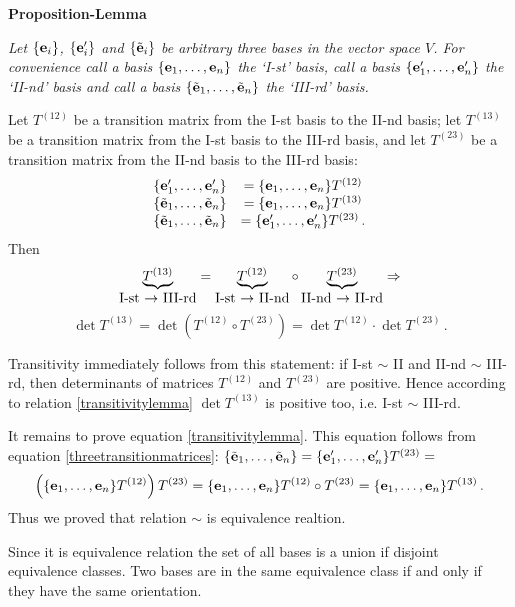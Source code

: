 \documentclass[12pt]{article}
\numberwithin{equation}{section}
\begin{document}
{\bf Proposition-Lemma}  {\it 
Let $\{{\bf e}_i\}$, $\{{\bf e}'_i\}$ and $\{\tilde{{\bf e}}_i\}$
be arbitrary {\it three} bases in the vector space $V$.
For convenience call a basis $\{{\bf e}_1,\dots,{\bf e}_n\}$ 
the `I-st' basis,
 call a basis $\{{\bf e}'_1,\dots,{\bf e}'_n\}$ the `II-nd' basis and
  call a basis $\{\tilde {{\bf e}}_1,\dots, \tilde{{\bf e}}_n\}$ 
the `III-rd' basis.

   Let $T^{(12)}$ be a transition 
matrix from the I-st basis to the II-nd basis; let
  $T^{(13)}$ be a transition matrix from the I-st basis 
 to the III-rd basis, and let $T^{(23)}$ be a 
transition matrix 
from the II-nd basis to the III-rd basis:
    \begin{equation}\label{threetransitionmatrices}
                        \begin{matrix}
  \{{\bf e}'_1,\dots,{\bf e}'_n\}&=\{{\bf e}_1,\dots,{\bf e}_n\}T^{(12)}\cr
  \{\tilde{{\bf e}}_1,\dots,\tilde{{\bf e}}_n\}&=\{{\bf e}_1,\dots,{\bf e}_n\}
              T^{(13)}\cr
  \{\tilde{{\bf e}}_1,\dots,\tilde{{\bf e}}_n\}&=\{{\bf e}'_1,\dots,{\bf e}'_n\}
              T^{(23)}\,.
                        \end{matrix}
                         \end{equation}
Then
 $$
\underbrace{T^{(13)}}_{\hbox{I-st $\to$ III-rd}}=
 \underbrace{T^{(12)}}_{\hbox{I-st $\to$ II-nd}}\circ
  \underbrace{T^{(23)}}_{\hbox{II-nd $\to$ II-rd}}
\Rightarrow
    $$
         \begin{equation}
    \label{transitivitylemma}
\det T^{(13)}=\det (T^{(12)}\circ T^{(23)})=
   \det T^{(12)}\cdot \det T^{(23)}\,.
        \end{equation}
 
}


Transitivity immediately follows from this statement:
if I-st $\sim$ II and II-nd $\sim$ III-rd,
 then determinants of matrices $T^{(12)}$
and $T^{(23)}$ are positive. Hence according to relation
\eqref{transitivitylemma}
$\det T^{(13)}$ is positive too, 
i.e. I-st $\sim$ III-rd. 

  It remains to prove equation \eqref{transitivitylemma}.
This equation follows from equation 
\eqref{threetransitionmatrices}:
 $\{\tilde{{\bf e}}_1,\dots,\tilde{{\bf e}}_n\}=
\{{\bf e}'_1,\dots,{\bf e}'_n\}T^{(23)}=$
                        $$
      \left(\{{\bf e}_1,\dots,{\bf e}_n\}T^{(12)}\right)T^{(23)}=
\{{\bf e}_1,\dots,{\bf e}_n\}T^{(12)}\circ T^{(23)}=
\{{\bf e}_1,\dots,{\bf e}_n\}T^{(13)}\,.
                      $$
Thus we proved that relation $\sim$ is equivalence realtion.

        
Since it is equivalence relation the set of all bases is 
a union if disjoint equivalence classes.
Two bases are in the same equivalence class if and only if 
they have the same orientation.
\end{document}
